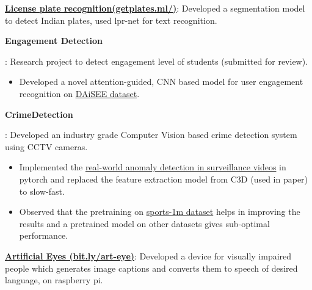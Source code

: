 \documentclass[letterpaper,10.9pt]{article}
\newcommand{\resumeItem}[2]{
  \item\small{
    \textbf{#1}{: #2 \vspace{-2pt}}
  }
}
\newcommand{\resumeSubItem}[2]{\resumeItem{#1}{#2}\vspace{-4pt}}
\begin{document}
{  %
    \resumeSubItem{\href{http://getplates.ml/}{\color{blue}License plate recognition(getplates.ml/)}}
     {Developed a segmentation model to detect Indian plates, used lpr-net for text recognition.}

    \resumeSubItem{Engagement Detection}
     {Research project to detect engagement level of students (submitted for review).
        \vspace{-5pt}
        \begin{itemize}
            \item Developed a novel attention-guided, CNN based model for user engagement recognition on \href{https://iith.ac.in/~daisee-dataset/}{\color{blue}DAiSEE dataset}. 
        \end{itemize}
     }
    \resumeSubItem{CrimeDetection}
      {Developed an industry grade Computer Vision based crime detection system using CCTV cameras.
      \vspace{-5pt}
        \begin{itemize}
            \item Implemented the \href{https://arxiv.org/abs/1801.04264}{\color{blue}real-world anomaly detection in surveillance videos} in pytorch and replaced the feature extraction model from C3D (used in paper) to slow-fast.
            \item Observed that the pretraining on \href{https://cs.stanford.edu/people/karpathy/deepvideo/}{\color{blue}sports-1m dataset} helps in improving the results and a pretrained model on other datasets gives sub-optimal performance. 
        \end{itemize} }
          
          
    \resumeSubItem{\color{blue}\href{http://bit.ly/art-eye}{Artificial Eyes (bit.ly/art-eye)}}{Developed a device for visually impaired people which generates image captions and converts them to speech of desired language, on raspberry pi.}
    
      

}
\end{document}
